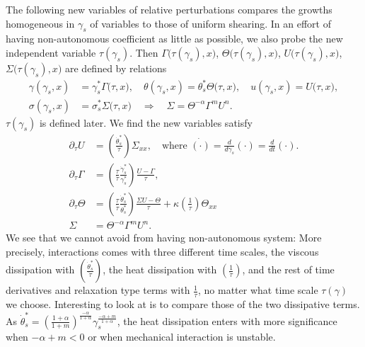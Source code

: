 \documentclass[a4paper,11pt]{article}
\theoremstyle{remark}
\begin{document}
The following new variables of relative perturbations compares the growths homogeneous in $\gamma_s$ of variables to those of uniform shearing. In an effort of having non-autonomous coefficient as little as possible, we also probe the new independent variable $\tau(\gamma_s)$. Then $\Gamma\big(\tau(\gamma_s),x\big)$, $\Theta\big(\tau(\gamma_s),x\big)$, $U\big(\tau(\gamma_s),x\big)$, $\Sigma\big(\tau(\gamma_s),x\big)$ are defined by relations
\begin{equation}
 \begin{aligned}
  \gamma(\gamma_s,x) &= \gamma^*_s\Gamma\big(\tau,x\big), \quad \theta(\gamma_s,x) = \theta^*_s\Theta\big(\tau,x\big), \quad u(\gamma_s,x)=U\big(\tau,x\big),\\
  \sigma(\gamma_s,x) &= \sigma^*_s\Sigma\big(\tau,x\big) \quad \Longrightarrow \quad \Sigma = \Theta^{-\alpha}\Gamma^m U^n.
 \end{aligned}
\end{equation}
$\tau( \gamma _s)$ is defined later. We find the new variables satisfy
\begin{equation*}
 \begin{aligned}
  \partial_\tau U &= \left(\frac{\dot\theta^*_s}{\dot{\tau}}\right) \Sigma_{xx}, \quad \text{where $\dot{(\cdot)}=\frac{d}{d\gamma_s}(\cdot)=\frac{d}{dt}(\cdot)$.} \\
  \partial_\tau \Gamma &= \left(\frac{\tau}{\dot\tau} \frac{\dot\gamma^*_s}{\gamma^*_s}\right) \frac{U-\Gamma}{\tau},\\
  \partial_\tau \Theta &= \left(\frac{\tau}{\dot\tau} \frac{\dot\theta^*_s}{\theta^*_s}\right) \frac{\Sigma U - \Theta}{\tau} + \kappa\left(\frac{1}{\dot\tau}\right) \Theta_{xx}\\
  \Sigma&=\Theta^{-\alpha}\Gamma^m U^n.
 \end{aligned}
\end{equation*}
We see that we cannot avoid from having non-autonomous system: More precisely, interactions comes with three different time scales, the viscous dissipation with $\left(\frac{\dot\theta^*_s}{\dot{\tau}}\right)$, the heat dissipation with $\left(\frac{1}{\dot\tau}\right)$, and the rest of time derivatives and relaxation type terms with $\frac{1}{\tau}$, no matter what time scale $\tau(\gamma)$ we choose. Interesting to look at is to compare those of the two dissipative terms. As $\dot\theta^*_s = \left( \frac{1+\alpha}{1+m}\right)^{\frac{-\alpha}{1+\alpha}}\gamma_s^{\frac{-\alpha+m}{1+\alpha}}$, the heat dissipation enters with more significance when $-\alpha+m<0$ or when mechanical interaction is unstable. 
\end{document}
